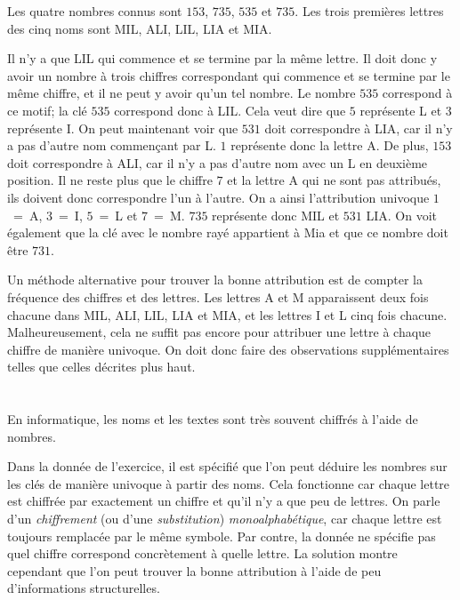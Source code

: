 {{Les quatre nombres connus sont $153$, $735$, $535$ et $735$. Les trois premières lettres des cinq noms sont MIL, ALI, LIL, LIA et MIA.

Il n’y a que LIL qui commence et se termine par la même lettre. Il doit donc y avoir un nombre à trois chiffres correspondant qui commence et se termine par le même chiffre, et il ne peut y avoir qu’un tel nombre. Le nombre $535$ correspond à ce motif; la clé $535$ correspond donc à LIL. Cela veut dire que $5$ représente L et $3$ représente I. On peut maintenant voir que $531$ doit correspondre à LIA, car il n’y a pas d’autre nom commençant par L. $1$ représente donc la lettre A. De plus, $153$ doit correspondre à ALI, car il n’y a pas d’autre nom avec un L en deuxième position. Il ne reste plus que le chiffre $7$ et la lettre A qui ne sont pas attribués, ils doivent donc correspondre l’un à l’autre. On a ainsi l’attribution univoque $1$~=~A, $3$~=~I, $5$~=~L et $7$~=~M. $735$ représente donc MIL et $531$ LIA. On voit également que la clé avec le nombre rayé appartient à Mia et que ce nombre doit être $731$.

Un méthode alternative pour trouver la bonne attribution est de compter la fréquence des chiffres et des lettres. Les lettres A et M apparaissent deux fois chacune dans MIL, ALI, LIL, LIA et MIA, et les lettres I et L cinq fois chacune. Malheureusement, cela ne suffit pas encore pour attribuer une lettre à chaque chiffre de manière univoque. On doit donc faire des observations supplémentaires telles que celles décrites plus haut.



\section*{\BrochureItsInformatics}
En informatique, les noms et les textes sont très souvent chiffrés à l’aide de nombres.

Dans la donnée de l’exercice, il est spécifié que l’on peut déduire les nombres sur les clés de manière univoque à partir des noms. Cela fonctionne car chaque lettre est chiffrée par exactement un chiffre et qu’il n’y a que peu de lettres. On parle d’un \emph{chiffrement} (ou d’une \emph{substitution}) \emph{monoalphabétique}, car chaque lettre est toujours remplacée par le même symbole. Par contre, la donnée ne spécifie pas quel chiffre correspond concrètement à quelle lettre. La solution montre cependant que l’on peut trouver la bonne attribution à l’aide de peu d’informations structurelles.

}}
